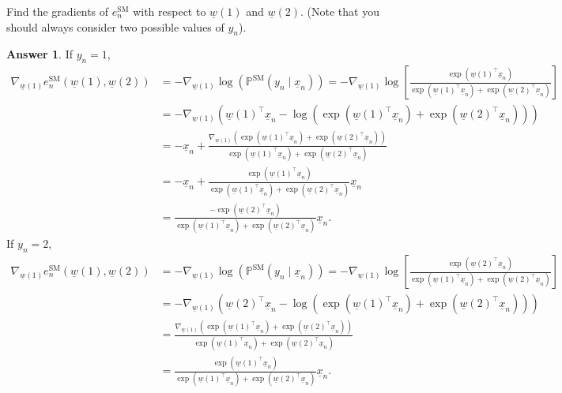\documentclass{article}
\newcommand{\probP}{\mathds{P}}
\theoremstyle{definition}
\newtheorem*{answer}{Answer}
\begin{document}
\begin{question}[start=0]
\begin{question}
		\item Find the gradients of $e^{\text{SM}}_{n}$ with respect to $\underline{w}(1)$ and $\underline{w}(2)$. (Note that you should always consider two possible values of $y_n$).
		\begin{answer}
			If $y_n = 1$, 
			\begin{align*}
				\nabla_{\!\underline{w}(1)}e^{\text{SM}}_{n}(\underline{w}(1), \underline{w}(2)) &= - \nabla_{\!\underline{w}(1)}\log(\probP^{\text{SM}}(y_n\mid \underline{x}_n)) = - \nabla_{\!\underline{w}(1)} \log\left[\frac{\exp(\underline{w}(1)^\top \underline{x}_n)}{\exp(\underline{w}(1)^\top\underline{x}_n) + \exp(\underline{w}(2)^\top\underline{x}_n)}\right]\\
				&= - \nabla_{\!\underline{w}(1)} \left(\underline{w}(1)^\top \underline{x}_n - \log\left(\exp(\underline{w}(1)^\top\underline{x}_n) + \exp(\underline{w}(2)^\top\underline{x}_n)\right)\right)\\
				&= -\underline{x}_n + \frac{\nabla_{\!\underline{w}(1)}\left(\exp(\underline{w}(1)^\top\underline{x}_n) + \exp(\underline{w}(2)^\top\underline{x}_n)\right)}{\exp(\underline{w}(1)^\top\underline{x}_n) + \exp(\underline{w}(2)^\top\underline{x}_n)}\\
				&=  -\underline{x}_n + \frac{\exp(\underline{w}(1)^\top\underline{x}_n)}{\exp(\underline{w}(1)^\top\underline{x}_n) + \exp(\underline{w}(2)^\top\underline{x}_n)}\underline{x}_n\\
				&=  \frac{-\exp(\underline{w}(2)^\top\underline{x}_n)}{\exp(\underline{w}(1)^\top\underline{x}_n) + \exp(\underline{w}(2)^\top\underline{x}_n)}\underline{x}_n.
			\end{align*}
			If $y_n = 2$, 
			\begin{align*}
				\nabla_{\!\underline{w}(1)}e^{\text{SM}}_{n}(\underline{w}(1), \underline{w}(2)) &= - \nabla_{\!\underline{w}(1)}\log(\probP^{\text{SM}}(y_n\mid \underline{x}_n)) = - \nabla_{\!\underline{w}(1)} \log\left[\frac{\exp(\underline{w}(2)^\top \underline{x}_n)}{\exp(\underline{w}(1)^\top\underline{x}_n) + \exp(\underline{w}(2)^\top\underline{x}_n)}\right]\\
				&= - \nabla_{\!\underline{w}(1)} \left(\underline{w}(2)^\top \underline{x}_n - \log\left(\exp(\underline{w}(1)^\top\underline{x}_n) + \exp(\underline{w}(2)^\top\underline{x}_n)\right)\right)\\
				&= \frac{\nabla_{\!\underline{w}(1)}\left(\exp(\underline{w}(1)^\top\underline{x}_n) + \exp(\underline{w}(2)^\top\underline{x}_n)\right)}{\exp(\underline{w}(1)^\top\underline{x}_n) + \exp(\underline{w}(2)^\top\underline{x}_n)}\\
				&=  \frac{\exp(\underline{w}(1)^\top\underline{x}_n)}{\exp(\underline{w}(1)^\top\underline{x}_n) + \exp(\underline{w}(2)^\top\underline{x}_n)}\underline{x}_n.
			\end{align*}
			

\end{answer}
\end{question}
\end{question}
\end{document}
